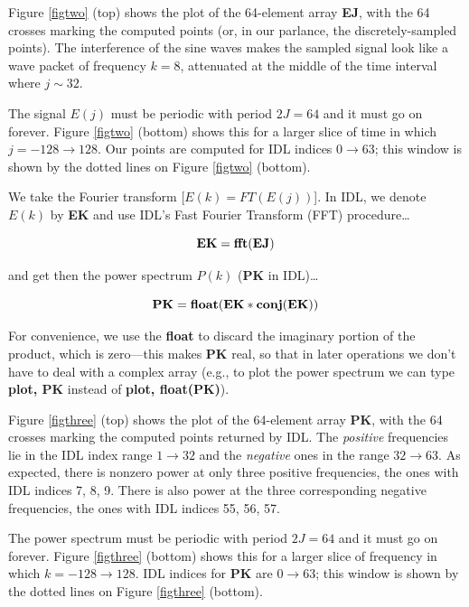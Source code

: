 \documentclass[psfig,preprint]{aastex}
\begin{document}
\noindent Figure \ref{figtwo} (top) shows the plot of the 64-element
array {\bf EJ}, with the 64 crosses marking the computed points (or, in
our parlance, the discretely-sampled points).  The interference of the
sine waves makes the sampled signal look like a wave packet of frequency
$k=8$, attenuated at the middle of the time interval where $j \sim 32$. 

	The signal $E(j)$ must be periodic with period $2J = 64$ and it
must go on forever.  Figure \ref{figtwo} (bottom) shows this for a
larger slice of time in which $j = -128 \rightarrow 128$.  Our points
are computed for IDL indices $0 \rightarrow 63$; this window is shown by
the dotted lines on Figure \ref{figtwo} (bottom). 

	We take the Fourier transform [$E(k) = FT( E(j))$].  In IDL, we
denote $E(k)$ by {\bf EK} and use IDL's Fast Fourier Transform (FFT)
procedure\dots

\begin{mathletters}
\begin{equation}
{\bf EK = fft(EJ)}
\end{equation}

\noindent and get then the power spectrum $P(k)$ ({\bf PK} in IDL)\dots

\begin{equation}
{\bf PK = float(EK * conj(EK))}
\end{equation}
\end{mathletters}

\noindent For convenience, we use the {\bf float} to discard the
imaginary portion of the product, which is zero---this makes {\bf PK}
real, so that in later operations we don't have to deal with a complex
array (e.g., to plot the power spectrum we can type {\bf plot, PK}
instead of {\bf plot, float(PK)}). 

	Figure \ref{figthree} (top) shows the plot of the 64-element
array {\bf PK}, with the 64 crosses marking the computed points returned
by IDL.  The {\it positive} frequencies lie in the IDL index range $1
\rightarrow 32$ and the {\it negative} ones in the range $32 \rightarrow
63$.  As expected, there is nonzero power at only three positive
frequencies, the ones with IDL indices 7, 8, 9.  There is also power at
the three corresponding negative frequencies, the ones with IDL indices
55, 56, 57. 

	The power spectrum must be periodic with period $2J = 64$ and it
must go on forever.  Figure \ref{figthree} (bottom) shows this for a
larger slice of frequency in which $k = -128 \rightarrow 128$.  IDL
indices for {\bf PK} are $0 \rightarrow 63$; this window is shown by the
dotted lines on Figure \ref{figthree} (bottom). 
\end{document}
